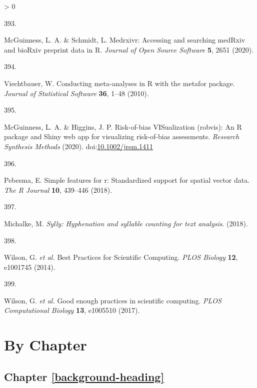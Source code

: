\documentclass[a4paper, twoside]{templates/ociamthesis}
\newlength{\cslhangindent}
\newlength{\csllabelwidth}
\newenvironment{CSLReferences}[3] %
 {%
  \setlength{\parindent}{0pt}
  \ifodd #1 \everypar{\setlength{\hangindent}{\cslhangindent}}\ignorespaces\fi
  \ifnum #2 > 0
  \setlength{\parskip}{#2\baselineskip}
  \fi
 }%
 {}
\newcommand{\CSLLeftMargin}[1]{\parbox[t]{\maxof{\widthof{#1}}{\csllabelwidth}}{#1}}
\newcommand{\CSLRightInline}[1]{\parbox[t]{\linewidth - \csllabelwidth}{#1}}
\begin{document}
\begin{CSLReferences}{0}{0}
\leavevmode\hypertarget{ref-medrxivr2020}{}%
\CSLLeftMargin{393. }
\CSLRightInline{McGuinness, L. A. \& Schmidt, L. Medrxivr: Accessing and searching {medRxiv} and {bioRxiv} preprint data in {R}. \emph{Journal of Open Source Software} \textbf{5}, 2651 (2020).}

\leavevmode\hypertarget{ref-metafor2010}{}%
\CSLLeftMargin{394. }
\CSLRightInline{Viechtbauer, W. Conducting meta-analyses in {R} with the {metafor} package. \emph{Journal of Statistical Software} \textbf{36}, 1--48 (2010).}

\leavevmode\hypertarget{ref-robvis2020}{}%
\CSLLeftMargin{395. }
\CSLRightInline{McGuinness, L. A. \& Higgins, J. P. Risk-of-bias {VISualization} (robvis): An {R} package and {Shiny} web app for visualizing risk-of-bias assessments. \emph{Research Synthesis Methods} (2020). doi:\href{https://doi.org/10.1002/jrsm.1411}{10.1002/jrsm.1411}}

\leavevmode\hypertarget{ref-sf2018}{}%
\CSLLeftMargin{396. }
\CSLRightInline{Pebesma, E. Simple features for r: Standardized support for spatial vector data. \emph{The R Journal} \textbf{10}, 439--446 (2018).}

\leavevmode\hypertarget{ref-sylly2018}{}%
\CSLLeftMargin{397. }
\CSLRightInline{Michalke, M. \emph{Sylly: Hyphenation and syllable counting for text analysis}. (2018).}

\leavevmode\hypertarget{ref-wilson2014}{}%
\CSLLeftMargin{398. }
\CSLRightInline{Wilson, G. \emph{et al.} Best {Practices} for {Scientific Computing}. \emph{PLOS Biology} \textbf{12}, e1001745 (2014).}

\leavevmode\hypertarget{ref-wilson2017}{}%
\CSLLeftMargin{399. }
\CSLRightInline{Wilson, G. \emph{et al.} Good enough practices in scientific computing. \emph{PLOS Computational Biology} \textbf{13}, e1005510 (2017).}

\end{CSLReferences}

\startappendices

\hypertarget{chapter-appendix-heading}{%
\chapter{By Chapter}\label{chapter-appendix-heading}}

\hypertarget{appendix-into}{%
\section{Chapter \ref{background-heading}}\label{appendix-into}}
\end{document}
